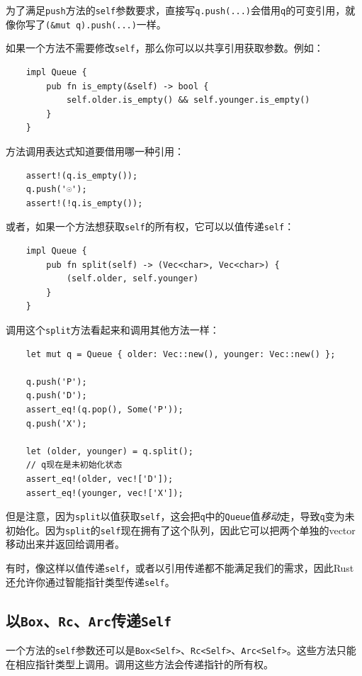 为了满足\texttt{push}方法的\texttt{self}参数要求，直接写\texttt{q.push(...)}会借用\texttt{q}的可变引用，就像你写了\texttt{(\&mut q).push(...)}一样。

如果一个方法不需要修改\texttt{self}，那么你可以以共享引用获取参数。例如：
\begin{verbatim}
    impl Queue {
        pub fn is_empty(&self) -> bool {
            self.older.is_empty() && self.younger.is_empty()
        }
    }
\end{verbatim}

方法调用表达式知道要借用哪一种引用：
\begin{verbatim}
    assert!(q.is_empty());
    q.push('☉');
    assert!(!q.is_empty());
\end{verbatim}

或者，如果一个方法想获取\texttt{self}的所有权，它可以以值传递\texttt{self}：
\begin{verbatim}
    impl Queue {
        pub fn split(self) -> (Vec<char>, Vec<char>) {
            (self.older, self.younger)
        }
    }
\end{verbatim}

调用这个\texttt{split}方法看起来和调用其他方法一样：
\begin{verbatim}
    let mut q = Queue { older: Vec::new(), younger: Vec::new() };

    q.push('P');
    q.push('D');
    assert_eq!(q.pop(), Some('P'));
    q.push('X');

    let (older, younger) = q.split();
    // q现在是未初始化状态
    assert_eq!(older, vec!['D']);
    assert_eq!(younger, vec!['X']);
\end{verbatim}

但是注意，因为\texttt{split}以值获取\texttt{self}，这会把\texttt{q}中的\texttt{Queue}值\emph{移动}走，导致\texttt{q}变为未初始化。因为\texttt{split}的\texttt{self}现在拥有了这个队列，因此它可以把两个单独的vector移动出来并返回给调用者。

有时，像这样以值传递\texttt{self}，或者以引用传递都不能满足我们的需求，因此Rust还允许你通过智能指针类型传递\texttt{self}。

\subsection{以\texttt{Box}、\texttt{Rc}、\texttt{Arc}传递\texttt{Self}}

一个方法的\texttt{self}参数还可以是\texttt{Box<Self>}、\texttt{Rc<Self>}、\texttt{Arc<Self>}。这些方法只能在相应指针类型上调用。调用这些方法会传递指针的所有权。

